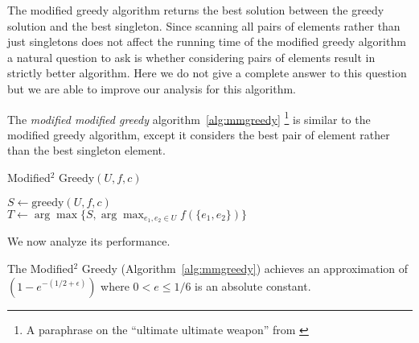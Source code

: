 The modified greedy algorithm returns the best solution between the greedy solution and the best singleton.
Since scanning all pairs of elements rather than just singletons does not affect the running time of the modified greedy algorithm a natural question to ask is whether considering pairs of elements result in strictly better algorithm.
Here we do not give a complete answer to this question but we are able to improve our analysis for this algorithm. 

The \emph{modified modified greedy} algorithm~\ref{alg:mmgreedy} 
\footnote{A paraphrase on the ``ultimate ultimate weapon'' from \cite{ninjago2017}}
is similar to the  modified greedy algorithm, 
except it considers the best pair of element rather than the best singleton element.


\begin{algorithm}[H]
\label{alg:mmgreedy}
\caption{Modified$^2$ Greedy$(U, f, c)$}

$S \leftarrow \text{greedy}(U, f, c)$
\\
$T \leftarrow \arg\max\{S, \arg\max_{e_1, e_2 \in U}f(\{e_1, e_2\})\}$
\\
\end{algorithm}

We now analyze its performance.

\begin{theorem}
	\label{theorem:mmgreedy}
	The Modified$^2$ Greedy (Algorithm~\ref{alg:mmgreedy}) achieves an approximation of $(1-e^{-(1/2 + \epsilon)})$ where $0 < e \leq 1/6$ is an absolute constant.
\end{theorem}


